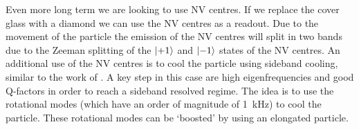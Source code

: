 Even more long term we are looking to use NV centres. If we replace the cover glass with a diamond we can use the NV centres as a readout. Due to the movement of the particle the emission of the NV centres will split in two bands due to the Zeeman splitting of the $\ket{+1}$ and $\ket{-1}$ states of the NV centres. An additional use of the NV centres is to cool the particle using sideband cooling, similar to the work of \textcite{delord_spin-cooling_2020}. A key step in this case are high eigenfrequencies and good Q-factors in order to reach a sideband resolved regime. The idea is to use the rotational modes (which have an order of magnitude of \qty{1}{\kilo\hertz}) to cool the particle. These rotational modes can be `boosted' by using an elongated particle\cite{huillery_spin-mechanics_2020}.
